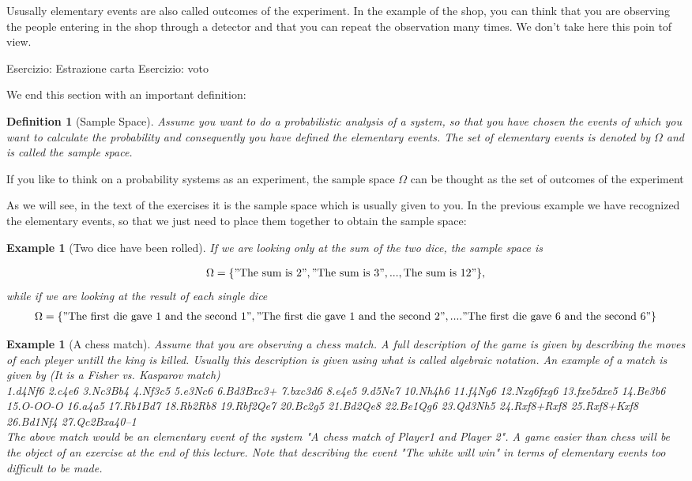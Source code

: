 \documentclass[reqno]{amsart}
\newtheorem{definition}[theorem]{Definition}
\newtheorem{example}[theorem]{Example}
\newcommand{\<}{{\langle \!\! \langle}}
\renewcommand{\>}{{\rangle \!\! \rangle}}
\newcommand{\bel}[2]{\begin{equation} \label{#1} \begin{split} #2
 					\end{split} \end{equation}}
\newcommand{\commento}[1]{
	\par\noindent
	\colorbox{light}{\begin{minipage}{120 mm}#1\end{minipage}}
	\par\noindent
}
\begin{document}
\commento{ Ususally elementary events are also called outcomes of the experiment. In the example of the shop, you can think that you are observing the people entering in the shop through a detector and that you can repeat the observation many times. We don't take here this poin tof view. }



Esercizio: Estrazione carta Esercizio: voto

We end this section with an important definition: 
\begin{definition}[Sample Space]
Assume you want to do a probabilistic analysis of a system, so that you have chosen the events of which you want to calculate the probability and consequently you have defined the elementary events. The set of elementary events is denoted by $\Omega$ and is called the sample space.
\end{definition}

\commento{If you like to think on a probability systems as an experiment, the sample space $\Omega$ can be thought as the set of outcomes of the experiment} 
As we will see, in the text of the exercises it is the sample space which is usually given to you. 
In the previous example we have recognized the elementary events, so that we just need to place them together to obtain the sample space: 

\begin{example}[Two dice have been rolled]
If we are looking only at the sum of the two dice, the sample space is 

\bel{}{ \Omega=\{ " \textrm{The sum is 2}"," \textrm{The sum is 3}",..., \textrm{The sum is 12}"\},
}
while if we are looking at the result of each single dice 
\bel{}{
 \Omega=\{ " \textrm{The first die gave 1 and the second 1}"," \textrm{The first die gave 1 and the second 2}",...." \textrm{The first die gave 6 and the second 6}"\}
} 
\end{example}

\begin{example}[A chess match]
Assume that you are observing a chess match. A full description of the game is given by describing the moves of each pleyer untill the king is killed. Usually this description is given using what is called algebraic notation. An example of a match is given by (It is a Fisher vs. Kasparov match) \\
1.d4Nf6 2.c4e6 3.Nc3Bb4 4.Nf3c5 5.e3Nc6 6.Bd3Bxc3+ 7.bxc3d6 8.e4e5 9.d5Ne7 10.Nh4h6 11.f4Ng6 12.Nxg6fxg6 13.fxe5dxe5 14.Be3b6 15.O-OO-O 16.a4a5 17.Rb1Bd7 18.Rb2Rb8 19.Rbf2Qe7 20.Bc2g5 21.Bd2Qe8 22.Be1Qg6 23.Qd3Nh5 24.Rxf8+Rxf8 25.Rxf8+Kxf8 26.Bd1Nf4 27.Qc2Bxa40–1\\
The above match would be an elementary event of the system "A chess match of Player1 and Player 2". A game easier than chess will be the object of an exercise at the end of this lecture. Note that describing the event "The white will win" in terms of elementary events too difficult to be made. 
\end{example}
\end{document}
